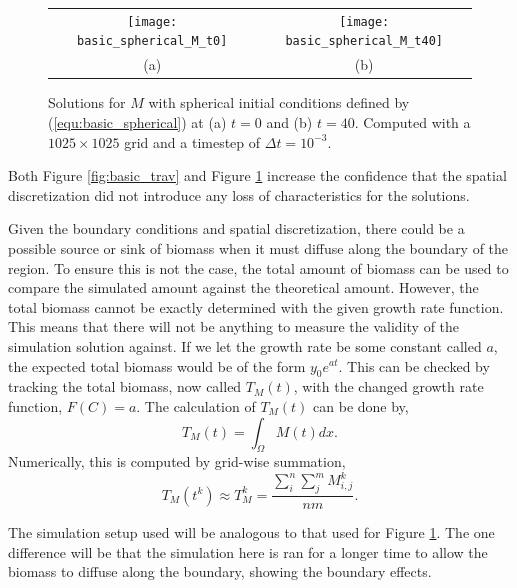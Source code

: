   \begin{figure}
    \centering
    \begin{tabular}{c c}
      \texttt{[image: basic\_spherical\_M\_t0]} & 
      \texttt{[image: basic\_spherical\_M\_t40]} \\
      (a) & (b)
    \end{tabular}
    \caption{Solutions for $M$ with spherical initial conditions defined by (\ref{equ:basic_spherical}) at (a) $t = 0$ and (b) $t = 40$. Computed with a $1025 \times 1025$ grid and a timestep of $\Delta t = 10^{-3}$.}
    \label{fig:basic_spherical}
  \end{figure}
  
  Both Figure \ref{fig:basic_trav} and Figure \ref{fig:basic_spherical} increase the confidence that the spatial discretization did not introduce any loss of characteristics for the solutions.
    
  Given the boundary conditions and spatial discretization, there could be a possible source or sink of biomass when it must diffuse along the boundary of the region.
  To ensure this is not the case, the total amount of biomass can be used to compare the simulated amount against the theoretical amount. 
  However, the total biomass cannot be exactly determined with the given growth rate function.
  This means that there will not be anything to measure the validity of the simulation solution against.
  If we let the growth rate be some constant called $a$, the expected total biomass would be of the form $y_0 e^{at}$.
  This can be checked by tracking the total biomass, now called $T_{M}(t)$, with the changed growth rate function, $F(C) = a$.
  The calculation of $T_{M}(t)$ can be done by,
  \begin{equation} \label{equ:total_biomass}
    T_{M}(t) = \int_{\Omega} M(t) dx.
  \end{equation}
  Numerically, this is computed by grid-wise summation,
  \begin{equation}
    T_{M}(t^k) \approx T_{M}^{k} = \frac{ \sum^n_i \sum^m_j M^{k}_{i,j} }{nm}.
  \end{equation}

  The simulation setup used will be analogous to that used for Figure \ref{fig:basic_spherical}.
  The one difference will be that the simulation here is ran for a longer time to allow the biomass to diffuse along the boundary, showing the boundary effects.
 
